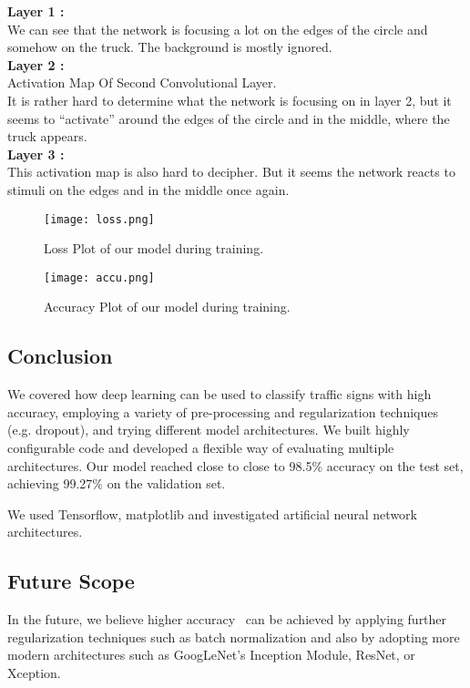 {\textbf{Layer 1 :}}\\
We can see that the network is focusing a lot on the edges of the circle and somehow on the truck. The background is mostly ignored.\\

{\textbf{Layer 2 :}}\\
Activation Map Of Second Convolutional Layer.\\

It is rather hard to determine what the network is focusing on in layer 2, but it seems to “activate” around the edges of the circle and in the middle, where the truck appears.\\

{\textbf{Layer 3 :}}\\
This activation map is also hard to decipher. But it seems the network reacts to stimuli on the edges and in the middle once again.\\

\begin{figure}[H]
	\centering
	\texttt{[image: loss.png]}
	\caption{Loss Plot of our model during training.}
\end{figure}

\begin{figure}[H]
	\centering
	\texttt{[image: accu.png]}
	\caption{Accuracy Plot of our model during training.}
\end{figure}

\subsection{Conclusion}
We covered how deep learning can be used to classify traffic signs with high accuracy, employing a variety of pre-processing and regularization techniques (e.g. dropout), and trying different model architectures. We built highly configurable code and developed a flexible way of evaluating multiple architectures. Our model reached close to close to 98.5\% accuracy on the test set, achieving 99.27\% on the validation set.

We used Tensorflow, matplotlib and investigated artificial neural network architectures.

\subsection{Future Scope}
In the future, we believe higher accuracy~\cite{8575857} can be achieved by applying further regularization techniques such as batch normalization and also by adopting more modern architectures such as GoogLeNet’s Inception Module, ResNet, or Xception.



